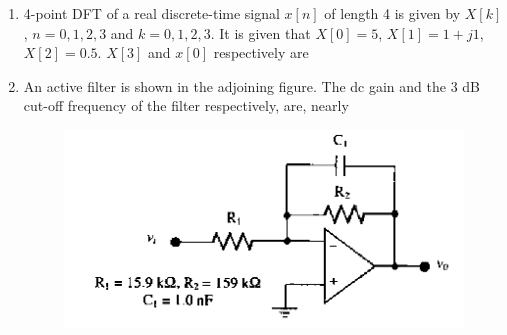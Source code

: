 \documentclass[journal,12pt,onecolumn]{IEEEtran}
\theoremstyle{remark}
\begin{document}
\begin{enumerate}
\hfill{}\begin{enumerate}  \end{enumerate}



\item 4-point DFT of a real discrete-time signal $x[n]$ of length 4 is given by $X[k]$, $n=0,1,2,3$ and $k=0,1,2,3$. It is given that $X[0]=5$, $X[1]=1+j1$, $X[2]=0.5$. $X[3]$ and $x[0]$ respectively are

\hfill{}
\begin{enumerate}  
\end{enumerate}



\item An active filter is shown in the adjoining figure. The dc gain and the 3 dB cut-off frequency of the filter respectively, are, nearly
\begin{figure}[H]
    \centering
    \includegraphics[width = 0.7\columnwidth]{q47}
    \caption*{}
    \label{fig:Q47}
\end{figure}

\hfill{}
\begin{enumerate} 
\end{enumerate}



\end{enumerate}
\end{document}
